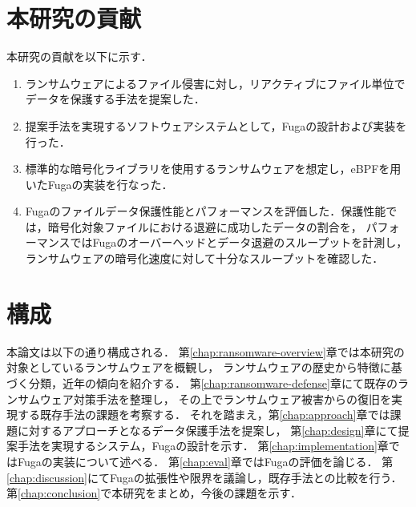 \section{本研究の貢献}
本研究の貢献を以下に示す．
\begin{enumerate}
  \item ランサムウェアによるファイル侵害に対し，リアクティブにファイル単位でデータを保護する手法を提案した．

  \item 提案手法を実現するソフトウェアシステムとして，Fugaの設計および実装を行った．


  \item 標準的な暗号化ライブラリを使用するランサムウェアを想定し，eBPFを用いたFugaの実装を行なった．

  \item Fugaのファイルデータ保護性能とパフォーマンスを評価した．保護性能では，暗号化対象ファイルにおける退避に成功したデータの割合を，
        パフォーマンスではFugaのオーバーヘッドとデータ退避のスループットを計測し，ランサムウェアの暗号化速度に対して十分なスループットを確認した．
\end{enumerate}

\section{構成}
本論文は以下の通り構成される．
第\ref{chap:ransomware-overview}章では本研究の対象としているランサムウェアを概観し，
ランサムウェアの歴史から特徴に基づく分類，近年の傾向を紹介する．
第\ref{chap:ransomware-defense}章にて既存のランサムウェア対策手法を整理し，
その上でランサムウェア被害からの復旧を実現する既存手法の課題を考察する．
それを踏まえ，第\ref{chap:approach}章では課題に対するアプローチとなるデータ保護手法を提案し，
第\ref{chap:design}章にて提案手法を実現するシステム，Fugaの設計を示す．
第\ref{chap:implementation}章ではFugaの実装について述べる．
第\ref{chap:eval}章ではFugaの評価を論じる．
第\ref{chap:discussion}にてFugaの拡張性や限界を議論し，既存手法との比較を行う．
第\ref{chap:conclusion}で本研究をまとめ，今後の課題を示す．
